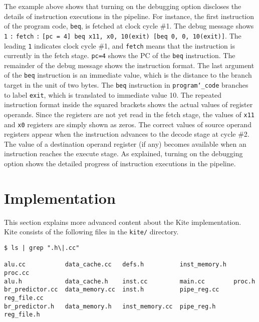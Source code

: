 \documentclass[10pt]{article}
\begin{document}
The example above shows that turning on the debugging option discloses the details of instruction executions in the pipeline.
For instance, the first instruction of the program code, {\tt beq}, is fetched at clock cycle \#1.
The debug message shows {\tt 1} {\tt :} {\tt fetch} {\tt :} {\tt[pc = 4] beq x11, x0, 10(exit) [beq 0, 0, 10(exit)]}.
The leading {\tt 1} indicates clock cycle \#1, and {\tt fetch} means that the instruction is currently in the fetch stage.
{\tt pc=4} shows the PC of the {\tt beq} instruction.
The remainder of the debug message shows the instruction format.
The last argument of the {\tt beq} instruction is an immediate value, which is the distance to the branch target in the unit of two bytes.
The {\tt beq} instruction in {\tt program\char`_code} branches to label {\tt exit}, which is translated to immediate value 10.
The repeated instruction format inside the squared brackets shows the actual values of register operands.
Since the registers are not yet read in the fetch stage, the values of {\tt x11} and {\tt x0} registers are simply shown as zeros.
The correct values of source operand registers appear when the instruction advances to the decode stage at cycle \#2.
The value of a destination operand register (if any) becomes available when an instruction reaches the execute stage.
As explained, turning on the debugging option shows the detailed progress of instruction executions in the pipeline.


\section{Implementation} \label{sec:implementation}
This section explains more advanced content about the Kite implementation.
Kite consists of the following files in the {\tt kite/} directory.

\begin{Verbatim}[frame=single]
$ ls | grep ".h\|.cc"

alu.cc           data_cache.cc   defs.h          inst_memory.h  proc.cc
alu.h            data_cache.h    inst.cc         main.cc        proc.h
br_predictor.cc  data_memory.cc  inst.h          pipe_reg.cc    reg_file.cc
br_predictor.h   data_memory.h   inst_memory.cc  pipe_reg.h     reg_file.h
\end{Verbatim}
\end{document}
